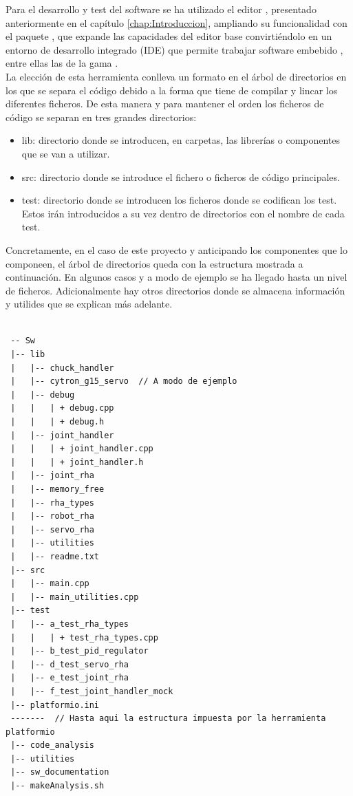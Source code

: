Para el desarrollo y test del software se ha utilizado el editor , presentado anteriormente en el capítulo \ref{chap:Introduccion}, ampliando su funcionalidad con el paquete , que expande las capacidades del editor base convirtiéndolo en un entorno de desarrollo integrado (IDE) que permite trabajar software embebido , entre ellas las de la gama .
\\

La elección de esta herramienta conlleva un formato en el árbol de directorios en los que se separa el código debido a la forma que tiene de compilar y lincar los diferentes ficheros. De esta manera y para mantener el orden los ficheros de código se separan en tres grandes directorios:

\begin{itemize}
    \item lib: directorio donde se introducen, en carpetas, las librerías o componentes que se van a utilizar.
    \item src: directorio donde se introduce el fichero o ficheros de código principales.
    \item test: directorio donde se introducen los ficheros donde se codifican los test. Estos irán introducidos a su vez dentro de directorios con el nombre de cada test.
\end{itemize}

Concretamente, en el caso de este proyecto y anticipando los componentes que lo componeen, el árbol de directorios queda con la  estructura mostrada a continuación. En algunos casos y a modo de ejemplo se ha llegado hasta un nivel de ficheros. Adicionalmente hay otros directorios donde se almacena información y utilides que se explican más adelante.

\lstset{language=C, breaklines=true, basicstyle=\footnotesize}
    \begin{lstlisting}[frame=single]

 -- Sw
 |-- lib
 |   |-- chuck_handler
 |   |-- cytron_g15_servo  // A modo de ejemplo
 |   |-- debug
 |   |   | + debug.cpp
 |   |   | + debug.h
 |   |-- joint_handler
 |   |   | + joint_handler.cpp
 |   |   | + joint_handler.h
 |   |-- joint_rha
 |   |-- memory_free
 |   |-- rha_types
 |   |-- robot_rha
 |   |-- servo_rha
 |   |-- utilities
 |   |-- readme.txt
 |-- src
 |   |-- main.cpp
 |   |-- main_utilities.cpp
 |-- test
 |   |-- a_test_rha_types
 |   |   | + test_rha_types.cpp
 |   |-- b_test_pid_regulator
 |   |-- d_test_servo_rha
 |   |-- e_test_joint_rha
 |   |-- f_test_joint_handler_mock
 |-- platformio.ini
 -------  // Hasta aqui la estructura impuesta por la herramienta platformio
 |-- code_analysis
 |-- utilities
 |-- sw_documentation
 |-- makeAnalysis.sh
    \end{lstlisting}


